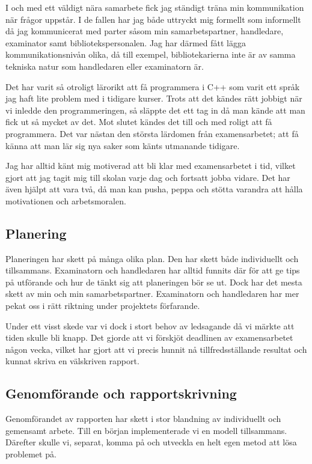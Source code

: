 \documentclass{article}
\begin{document}
I och med ett väldigt nära samarbete fick jag ständigt träna min kommunikation när frågor uppstår. I de fallen har jag både uttryckt mig formellt som informellt då jag kommunicerat med parter såsom min samarbetspartner, handledare, examinator samt bibliotekspersonalen. Jag har därmed fått lägga kommunikationsnivån olika, då till exempel, bibliotekarierna inte är av samma tekniska natur som handledaren eller examinatorn är.

Det har varit så otroligt lärorikt att få programmera i C++ som varit ett språk jag haft lite problem med i tidigare kurser. Trots att det kändes rätt jobbigt när vi inledde den programmeringen, så släppte det ett tag in då man kände att man fick ut så mycket av det. Mot slutet kändes det till och med roligt att få programmera. Det var nästan den största lärdomen från examensarbetet; att få känna att man lär sig nya saker som känts utmanande tidigare.

Jag har alltid känt mig motiverad att bli klar med examensarbetet i tid, vilket gjort att jag tagit mig till skolan varje dag och fortsatt jobba vidare. Det har även hjälpt att vara två, då man kan pusha, peppa och stötta varandra att hålla motivationen och arbetsmoralen. 



\subsection*{Planering}
Planeringen har skett på många olika plan. Den har skett både individuellt och tillsammans. Examinatorn och handledaren har alltid funnits där för att ge tips på utförande och hur de tänkt sig att planeringen bör se ut. Dock har det mesta skett av min och min samarbetspartner. Examinatorn och handledaren har mer pekat oss i rätt riktning under projektets förfarande.

Under ett visst skede var vi dock i stort behov av ledsagande då vi märkte att tiden skulle bli knapp. Det gjorde att vi förskjöt deadlinen av examensarbetet någon vecka, vilket har gjort att vi precis hunnit nå tillfredsställande resultat och kunnat skriva en välskriven rapport. 
\subsection*{Genomförande och rapportskrivning}
Genomförandet av rapporten har skett i stor blandning av individuellt och gemensamt arbete. Till en början implementerade vi en modell tillsammans. Därefter skulle vi, separat, komma på och utveckla en helt egen metod att lösa problemet på.
\end{document}
